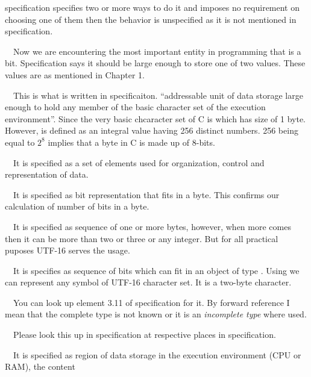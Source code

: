   specification specifies two or more ways to do it and imposes no
  requirement on choosing one of them then the behavior is unspecified
  as it is not mentioned in specification.
\item{}\textreference[bit]~~Now we are encountering the most
  important entity in programming that is a bit. Specification says it
  should be large enough to store one of two values. These
  values are as mentioned in Chapter 1.
\item{}\textreference[byte]~~This is what is written in
  specificaiton. ``addressable unit of data storage large enough to
  hold any member of the basic character set of the execution
  environment''. Since the very basic chcaracter set of C is
   which has size
  of 1 byte. However,  is defined as an integral value
  having 256 distinct numbers. 256 being equal to $2^8$ implies that a
  byte in C is made up of 8-bits.
\item{}\textreference[character]~~It is specified as a
  set of elements used for organization, control and representation of
  data.
  \startitemize[R]
\item{}~~It is specified as bit representation that fits in a
  byte. This confirms our calculation of number of bits in a byte.
\item{}~~It is specified as sequence of one or more bytes,
  however, when more comes then it can be more than two or three or
  any integer. But for all practical puposes UTF-16 serves the usage.
\item{}~~It is
  specifies as sequence of bits which can fit in an object of type
  . Using  we can represent any symbol of
  UTF-16 character set. It is a two-byte character.
\stopitemize
\item{}~~You
  can look up element 3.11 of specification for it. By forward
  reference I mean that the complete type is not known or it is an
  {\it incomplete type} where used.
\item{}\textreference[3.12 and 3.13]~~Please look
  this up in specification at respective places in specification.
\item{}\textreference[object]~~It is specified as region of
  data storage in the execution environment (CPU or RAM), the content
